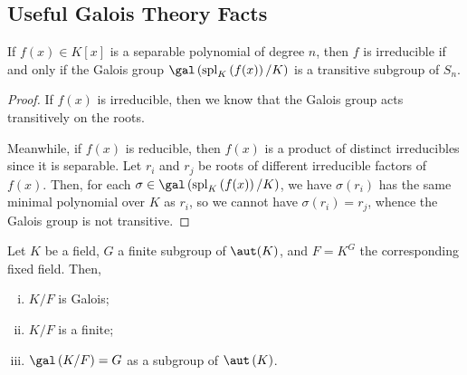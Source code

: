 \documentclass[10pt]{mypackage}
\begin{document}
\subsection{Useful Galois Theory Facts}%
\begin{theorem}
  If $f(x)\in K[x]$ is a separable polynomial of degree $n$, then $f$ is irreducible if and only if the Galois group $\gal\left( \operatorname{spl}_{K}\left(f(x)\right)/K \right)$ is a transitive subgroup of $S_n$.
\end{theorem}
\begin{proof}
  If $f(x)$ is irreducible, then we know that the Galois group acts transitively on the roots.

  Meanwhile, if $f(x)$ is reducible, then $f(x)$ is a product of distinct irreducibles since it is separable. Let $r_i$ and $r_j$ be roots of different irreducible factors of $f(x)$. Then, for each $\sigma\in \gal\left( \operatorname{spl}_{K}\left( f(x) \right)/K \right)$, we have $\sigma\left( r_i \right)$ has the same minimal polynomial over $K$ as $r_i$, so we cannot have $\sigma\left( r_i \right) = r_j$, whence the Galois group is not transitive.
\end{proof}
\begin{theorem}
  Let $K$ be a field, $G$ a finite subgroup of $\aut(K)$, and $F = K^{G}$ the corresponding fixed field. Then,
  \begin{enumerate}[(i)]
    \item $K/F$ is Galois;
    \item $K/F$ is a finite;
    \item $\gal\left( K/F \right) = G$ as a subgroup of $\aut\left( K \right)$.
  \end{enumerate}
\end{theorem}
\end{document}
